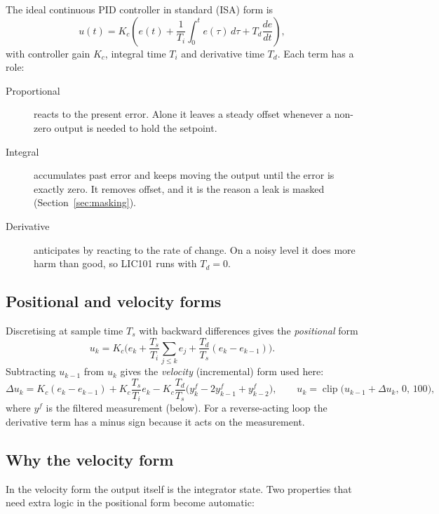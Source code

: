 The ideal continuous PID controller in standard (ISA) form is
\begin{equation}
  u(t) = K_c\left( e(t) + \frac{1}{T_i}\int_0^t e(\tau)\,d\tau
         + T_d\frac{de}{dt}\right),
\end{equation}
with controller gain $K_c$, integral time $T_i$ and derivative time $T_d$. Each
term has a role:
\begin{description}
  \item[Proportional] reacts to the present error. Alone it leaves a steady
        offset whenever a non-zero output is needed to hold the setpoint.
  \item[Integral] accumulates past error and keeps moving the output until
        the error is exactly zero. It removes offset, and it is the reason a
        leak is masked (Section~\ref{sec:masking}).
  \item[Derivative] anticipates by reacting to the rate of change. On a noisy
        level it does more harm than good, so LIC101 runs with $T_d=0$.
\end{description}

\subsection{Positional and velocity forms}

Discretising at sample time $T_s$ with backward differences gives the
\emph{positional} form
\begin{equation}
  u_k = K_c\Big(e_k + \frac{T_s}{T_i}\sum_{j\le k} e_j
        + \frac{T_d}{T_s}(e_k - e_{k-1})\Big).
\end{equation}
Subtracting $u_{k-1}$ from $u_k$ gives the \emph{velocity} (incremental) form
used here:
\begin{equation}
  \Delta u_k = K_c(e_k - e_{k-1}) + K_c\frac{T_s}{T_i}e_k
   - K_c\frac{T_d}{T_s}\big(y^f_k - 2y^f_{k-1} + y^f_{k-2}\big),
  \qquad u_k = \operatorname{clip}\big(u_{k-1} + \Delta u_k,\,0,\,100\big),
  \label{eq:velocity}
\end{equation}
where $y^f$ is the filtered measurement (below). For a reverse-acting loop the
derivative term has a minus sign because it acts on the measurement.

\subsection{Why the velocity form}

In the velocity form the output itself is the integrator state. Two
properties that need extra logic in the positional form become automatic:

